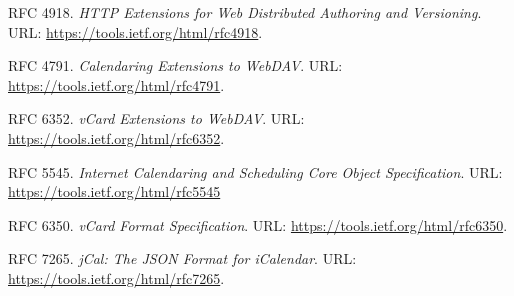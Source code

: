 \begin{thebibliography}{ABC}
    \setcounter{enumiv}{\value{firstbib}}

     RFC 4918. \emph{HTTP Extensions for Web Distributed Authoring and Versioning}. URL: \url{https://tools.ietf.org/html/rfc4918}.

     RFC 4791. \emph{Calendaring Extensions to WebDAV}. URL: \url{https://tools.ietf.org/html/rfc4791}.

     RFC 6352. \emph{vCard Extensions to WebDAV}. URL: \url{https://tools.ietf.org/html/rfc6352}.

     RFC 5545. \emph{Internet Calendaring and Scheduling Core Object Specification}. URL: \url{https://tools.ietf.org/html/rfc5545}

     RFC 6350. \emph{vCard Format Specification}. URL: \url{https://tools.ietf.org/html/rfc6350}.

     RFC 7265. \emph{jCal: The JSON Format for iCalendar}. URL: \url{https://tools.ietf.org/html/rfc7265}.

\end{thebibliography}

